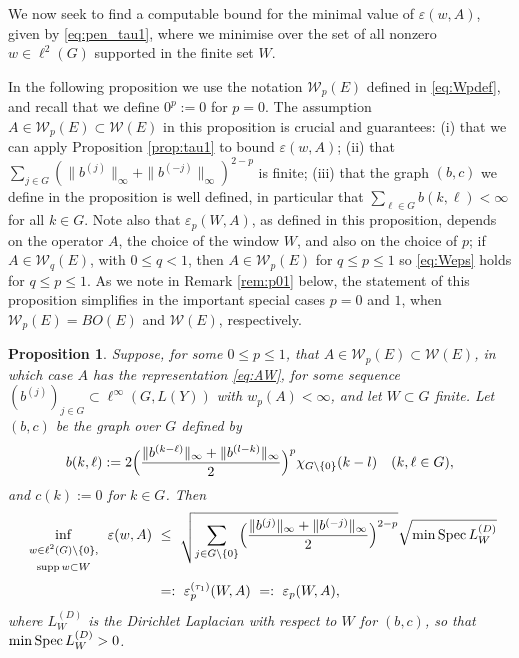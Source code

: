 \documentclass{article}
\newcommand\W{{\mathcal W}}
\newcommand\eps{{\varepsilon}}
\newcommand\Spec{{\rm Spec}\,}  %
\newcommand\supp{{\rm supp\,}}
\newtheorem{proposition}[theorem]{Proposition}
\numberwithin{equation}{section}   %
\numberwithin{figure}{section}  %
\begin{document}
We now seek to find a computable bound for the minimal value of $\varepsilon(w,A)$, given by \eqref{eq:pen_tau1}, where we minimise over the set of all nonzero $w\in \ell^2(G)$ supported in the finite set $W$.

In the following proposition we use the notation $\W_p(E)$ defined in \eqref{eq:Wpdef}, and recall that we define $0^p:= 0$ for $p=0$. The assumption $A\in \W_p(E)\subset \W(E)$ in this proposition is crucial and guarantees: 
(i) that we can apply Proposition \ref{prop:tau1} to bound $\eps(w,A)$; 
(ii) that $\sum_{j\in G} (\|b^{(j)}\|_\infty +\|b^{(-j)}\|_\infty)^{2-p}$ is finite; 
(iii) that the graph $(b,c)$ we define in the proposition is well defined, in particular that $\sum_{\ell\in G} b(k,\ell) < \infty$ for all $k\in G$. 
Note also that $\eps_p(W,A)$, as defined in this proposition, depends on the operator $A$, the choice of the window $W$, and also on the choice of $p$; if $A\in \W_q(E)$, with $0\leq q<1$, then $A\in \W_p(E)$ for $q\leq p\leq 1$ so \eqref{eq:Weps} holds for $q\leq p\leq 1$. As we note in Remark \ref{rem:p01} below, the statement of this proposition simplifies in the important special cases $p=0$ and $1$, when $\W_p(E) = BO(E)$ and $\W(E)$, respectively.

\begin{proposition}
\label{prop:min_eps_tau1}
Suppose, for some $0\leq p\leq 1$,  that $A\in \W_p(E)\subset \W(E)$, in which case $A$ has the representation \eqref{eq:AW},
for some sequence $(b^{(j)})_{j\in G} \subset \ell^\infty(G,L(Y))$ with $w_p(A) <\infty$, and let $W\subset G$ finite. Let $(b,c)$ be the graph over $G$ defined by
\[
b(k,\ell) := 2\Bigl(\frac{\|b^{(k-\ell)}\|_\infty + \|b^{(l-k)}\|_\infty}{2}\Bigr)^p \chi_{G\setminus\{0\}} (k-l)
\quad (k,\ell\in G),
\] 
and $c(k):= 0$ for $k\in G$.
Then
\begin{align}
\nonumber
\inf_{\begin{array}{c}{\scriptstyle w\in\ell^2(G)\setminus\{0\},}\\{\scriptstyle \supp w\subset W}\end{array}}\varepsilon(w,A) 
&\ \leq\ \sqrt{\sum_{j\in G\setminus\{0\}} \Bigl(\frac{\|b^{(j)}\|_\infty + \|b^{(-j)}\|_\infty}{2}\Bigr)^{2-p}} \sqrt{\min \Spec L_W^{(D)}}\\
\label{eq:Weps}
&\ =:\ \eps_p^{(\tau_1)}(W,A)\ =:\ \eps_p(W,A),
\end{align}
where $L_W^{(D)}$ is the Dirichlet Laplacian with respect to $W$ for $(b,c)$, so that $\min \Spec L_W^{(D)}>0$.
\end{proposition}
\end{document}
